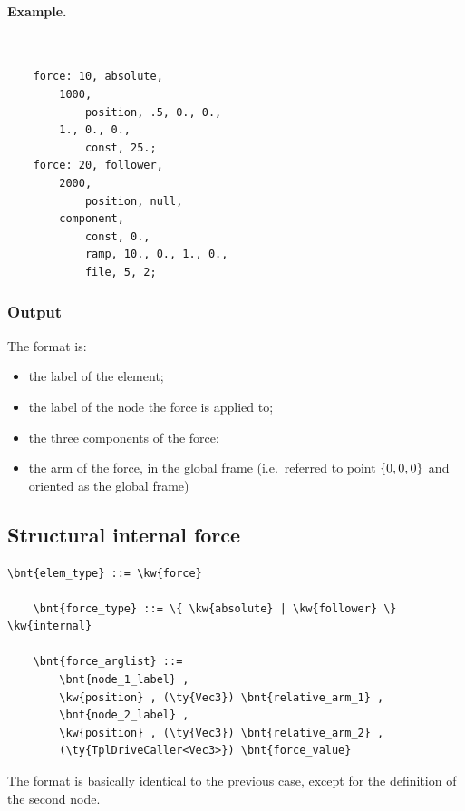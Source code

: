 \paragraph{Example.} \
\begin{verbatim}
    force: 10, absolute,
        1000,
            position, .5, 0., 0.,
        1., 0., 0.,
            const, 25.;
    force: 20, follower,
        2000,
            position, null,
        component,
            const, 0.,
            ramp, 10., 0., 1., 0.,
            file, 5, 2;
\end{verbatim}

\subsubsection{Output}
The format is:
\begin{itemize}
    \item the label of the element;
    \item the label of the node the force is applied to;
    \item the three components of the force;
    \item the arm of the force, in the global frame (i.e.\ referred
          to point $ \left\{ 0,0,0 \right\} $ and oriented as the global frame)
\end{itemize}

\subsection{Structural internal force}
\label{sec:EL:FORCE:STRUCTURAL:INTERNAL_FORCE}
\begin{Verbatim}[commandchars=\\\{\}]
    \bnt{elem_type} ::= \kw{force}

    \bnt{force_type} ::= \{ \kw{absolute} | \kw{follower} \} \kw{internal}

    \bnt{force_arglist} ::=
        \bnt{node_1_label} , 
        \kw{position} , (\ty{Vec3}) \bnt{relative_arm_1} ,
        \bnt{node_2_label} ,
        \kw{position} , (\ty{Vec3}) \bnt{relative_arm_2} ,
        (\ty{TplDriveCaller<Vec3>}) \bnt{force_value}
\end{Verbatim}
The format is basically identical to the previous case,
except for the definition of the second node.

